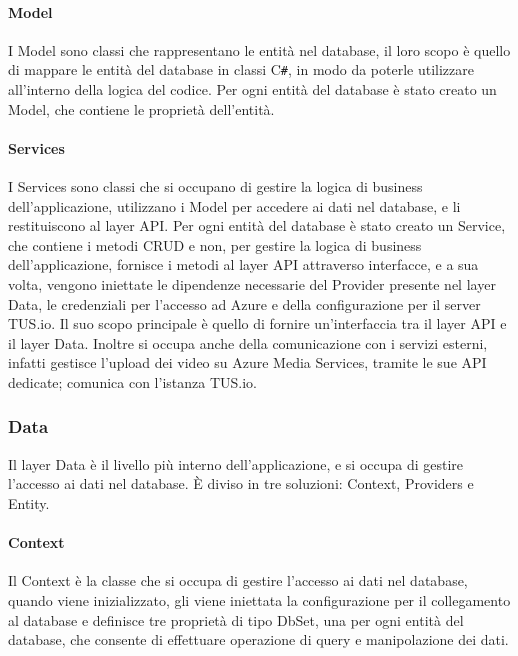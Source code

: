 \paragraph{Model}
I Model sono classi che rappresentano le entità nel database, il loro scopo è quello di mappare le entità del database in classi C\texttt{\#}, in modo da poterle utilizzare all'interno della logica del codice. Per ogni entità del database è stato creato un Model, che contiene le proprietà dell'entità.\\

\paragraph{Services}
I Services sono classi che si occupano di gestire la logica di business dell'applicazione, utilizzano i Model per accedere ai dati nel database, e li restituiscono al layer API. Per ogni entità del database è stato creato un Service, che contiene i metodi CRUD e non, per gestire la logica di business dell'applicazione, fornisce i metodi al layer API attraverso interfacce, e a sua volta, vengono iniettate le dipendenze necessarie del Provider presente nel layer Data, le credenziali per l'accesso ad Azure e della configurazione per il server TUS.io. Il suo scopo principale è quello di fornire un'interfaccia tra il layer API e il layer Data. Inoltre si occupa anche della comunicazione con i servizi esterni, infatti gestisce l'upload dei video su Azure Media Services, tramite le sue API dedicate; comunica con l'istanza TUS.io.\\

\subsubsection{Data}
Il layer Data è il livello più interno dell'applicazione, e si occupa di gestire l'accesso ai dati nel database. È diviso in tre soluzioni: Context, Providers e Entity.\\

\paragraph{Context}
Il Context è la classe che si occupa di gestire l'accesso ai dati nel database, quando viene inizializzato, gli viene iniettata la configurazione per il collegamento al database e definisce tre proprietà di tipo DbSet, una per ogni entità del database, che consente di effettuare operazione di query e manipolazione dei dati.\\

